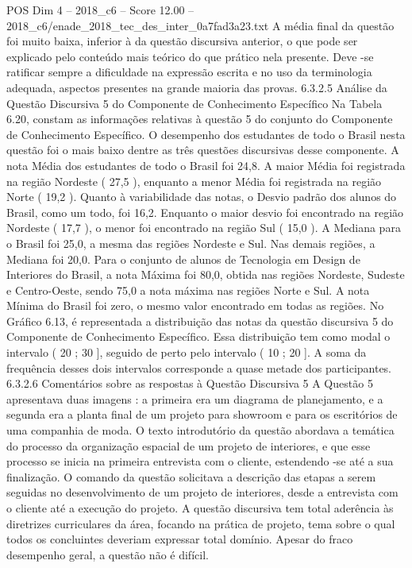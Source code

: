 \begin{textsample}{POS Dim 4 – 2018\_c6 – Score 12.00 – 2018\_c6/enade\_2018\_tec\_des\_inter\_0a7fad3a23.txt}
A média final da questão foi muito baixa, inferior à da questão discursiva anterior, o que pode ser explicado pelo conteúdo mais teórico do que prático nela presente.
Deve -se ratificar sempre a dificuldade na expressão escrita e no uso da terminologia adequada, aspectos presentes na grande maioria das provas. 6.3.2.5 Análise da Questão Discursiva 5 do Componente de Conhecimento Específico Na Tabela 6.20, constam as informações relativas à questão 5 do conjunto do Componente de Conhecimento Específico.
O desempenho dos estudantes de todo o Brasil nesta questão foi o mais baixo dentre as três questões discursivas desse componente.
A nota Média dos estudantes de todo o Brasil foi 24,8.
A maior Média foi registrada na região Nordeste ( 27,5 ), enquanto a menor Média foi registrada na região Norte ( 19,2 ).
Quanto à variabilidade das notas, o Desvio padrão dos alunos do Brasil, como um todo, foi 16,2.
Enquanto o maior desvio foi encontrado na região Nordeste ( 17,7 ), o menor foi encontrado na região Sul ( 15,0 ).
A Mediana para o Brasil foi 25,0, a mesma das regiões Nordeste e Sul.
Nas demais regiões, a Mediana foi 20,0.
Para o conjunto de alunos de Tecnologia em Design de Interiores do Brasil, a nota Máxima foi 80,0, obtida nas regiões Nordeste, Sudeste e Centro-Oeste, sendo 75,0 a nota máxima nas regiões Norte e Sul.
A nota Mínima do Brasil foi zero, o mesmo valor encontrado em todas as regiões.
No Gráfico 6.13, é representada a distribuição das notas da questão discursiva 5 do Componente de Conhecimento Específico.
Essa distribuição tem como modal o intervalo ( 20 ; 30 ], seguido de perto pelo intervalo ( 10 ; 20 ].
A soma da frequência desses dois intervalos corresponde a quase metade dos participantes. 6.3.2.6 Comentários sobre as respostas à Questão Discursiva 5 A Questão 5 apresentava duas imagens : a primeira era um diagrama de planejamento, e a segunda era a planta final de um projeto para showroom e para os escritórios de uma companhia de moda.
O texto introdutório da questão abordava a temática do processo da organização espacial de um projeto de interiores, e que esse processo se inicia na primeira entrevista com o cliente, estendendo -se até a sua finalização.
O comando da questão solicitava a descrição das etapas a serem seguidas no desenvolvimento de um projeto de interiores, desde a entrevista com o cliente até a execução do projeto.
A questão discursiva tem total aderência às diretrizes curriculares da área, focando na prática de projeto, tema sobre o qual todos os concluintes deveriam expressar total domínio.
Apesar do fraco desempenho geral, a questão não é difícil.

\end{textsample}
